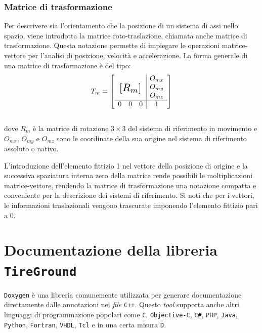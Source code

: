 \subsection{Matrice di trasformazione}
Per descrivere sia l'orientamento che la posizione di un sistema di assi nello spazio, viene introdotta la matrice roto-traslazione, chiamata anche matrice di trasformazione. Questa notazione permette di impiegare le operazioni matrice-vettore per l'analisi di posizione, velocità e accelerazione. La forma generale di una matrice di trasformazione è del tipo:
%
\begin{equation}
T_m = \left[
\begin{array}{ccc|c}
& & & O_{mx}\\
\multicolumn{3}{c|}{\multirow{3}{*}{\raisebox{20mm}{\scalebox{1.5}{$[R_m]$}}}} & O_{my}\\
& & & O_{mz}\\ \hline
0 & 0 & 0 & 1
\end{array}\right]
\end{equation}\\
%
dove $R_m$ è la matrice di rotazione $3 \times 3$ del sistema di riferimento in movimento e $O_{mx}$, $O_{my}$ e $O_{mz}$ sono le coordinate della sua origine nel sistema di riferimento assoluto o nativo.

L'introduzione dell'elemento fittizio 1 nel vettore della posizione di origine e la successiva spaziatura interna zero della matrice rende possibili le moltiplicazioni matrice-vettore, rendendo la matrice di trasformazione una notazione compatta e conveniente per la descrizione dei sistemi di riferimento. Si noti che per i vettori, le informazioni traslazionali vengono trascurate imponendo l'elemento fittizio pari a 0.
%
\chapter{Documentazione della libreria \texttt{TireGround}}
\label{Documentation}
%
\texttt{Doxygen} è una libreria comunemente utilizzata per generare documentazione direttamente dalle annotazioni nei \textit{file} \texttt{C++}. Questo \textit{tool} supporta anche altri linguaggi di programmazione popolari come \texttt{C}, \texttt{Objective-C}, \texttt{C\#}, \texttt{PHP},  \texttt{Java},  \texttt{Python}, \texttt{Fortran},  \texttt{VHDL},  \texttt{Tcl} e in una certa misura  \texttt{D}.


